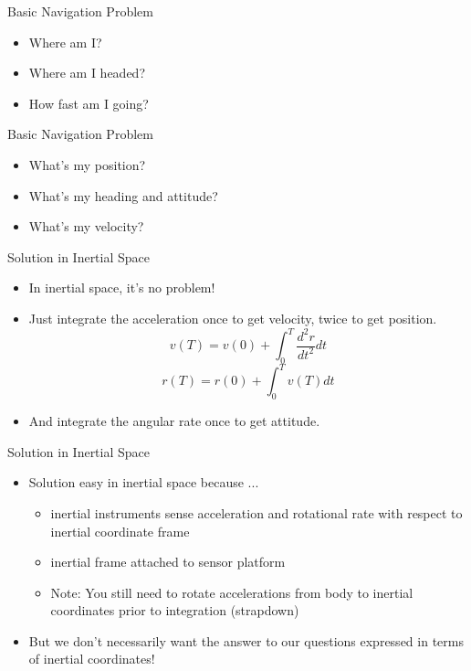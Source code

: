 \begin{frame}
Basic Navigation Problem
 \begin{itemize}
 \item Where am I?
 \item Where am I headed?
 \item How fast am I going?
\end{itemize}
\end{frame}
\begin{frame}
Basic Navigation Problem
 \begin{itemize}
 \item What's my position?
 \item What's my heading and attitude?
 \item What's my velocity?
\end{itemize}
\end{frame}
\begin{frame}
Solution in Inertial Space
 \begin{itemize}
 \item In inertial space, it's no problem!
 \item Just integrate the acceleration once to get velocity, twice to get
 position.
\[v(T) = v(0) + \int_{0}^{T}\dfrac{d^2r}{dt^2}dt\]
\[r(T) = r(0) + \int_{0}^{T}v(T)dt\]
 \item And integrate the angular rate once to get attitude.
\end{itemize}
\end{frame}

\begin{frame}
Solution in Inertial Space
\begin{itemize}
  \item Solution easy in inertial space because ...
  \begin{itemize}
	\item inertial instruments sense acceleration and rotational rate with respect to inertial coordinate frame 
	\item inertial frame attached to sensor platform
    \item Note: You still need to rotate accelerations from body to inertial coordinates prior to integration (strapdown)
  \end{itemize}
  \item But we don't necessarily want the answer to our questions expressed in terms of inertial coordinates!
\end{itemize} 
\end{frame}
